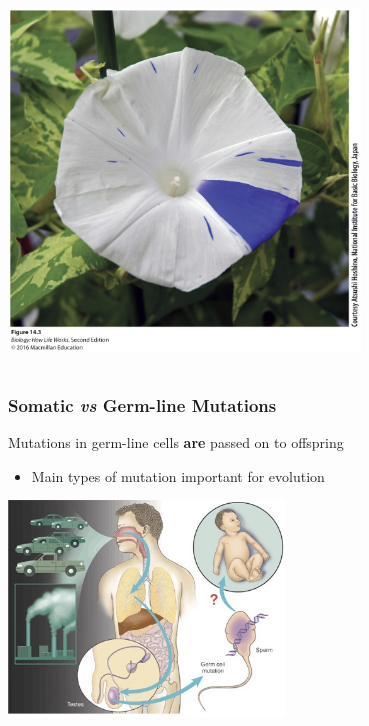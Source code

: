 \documentclass[10pt]{beamer}
\begin{document}
\begin{frame}[t]
\begin{columns}
		\begin{column}{0.5\textwidth}
			\centerline{\includegraphics[width=0.7\textwidth]{figures/figure_14_03.jpg}}
		\end{column}
	\end{columns}	
\end{frame}


\begin{frame}[t]
\frametitle{Somatic \emph{vs} Germ-line Mutations}
\vspace{0.25cm}
		
	Mutations in \textcolor{myblue}{germ-line cells} \textbf{are} passed on to offspring \\
		\smallskip
		\begin{itemize}
			\item Main types of mutation important for evolution
		\end{itemize}
	
	\vspace{0.25cm}
	
	\begin{center}
		\includegraphics[width=0.55\textwidth]{figures/pollution.jpg}
	\end{center}
\end{frame}
\end{document}
